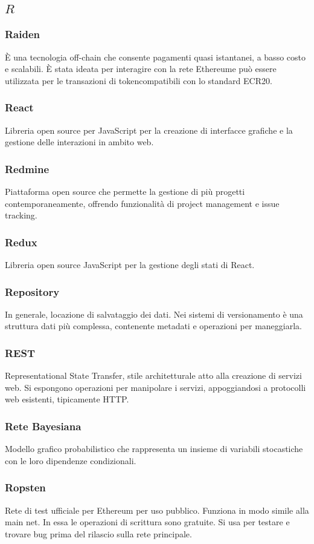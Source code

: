 \subsection*{\quad$R\quad$}
\subsubsection*{Raiden}
È una tecnologia off-chain che consente pagamenti quasi istantanei, a basso costo e scalabili. È stata ideata per interagire con la rete Ethereum\glosp e può essere utilizzata per le transazioni di token\glosp compatibili con lo standard ECR20\glo.

\subsubsection*{React}
Libreria open source per JavaScript per la creazione di interfacce grafiche e la gestione delle interazioni in ambito web.

\subsubsection*{Redmine}
Piattaforma open source che permette la gestione di più progetti contemporaneamente, offrendo funzionalità di project management e issue tracking.

\subsubsection*{Redux}
Libreria open source JavaScript per la gestione degli stati di React\glo.

\subsubsection*{Repository}
In generale, locazione di salvataggio dei dati. Nei sistemi di versionamento è una struttura dati più complessa, contenente metadati e operazioni per maneggiarla.

\subsubsection*{REST}
Representational State Transfer, stile architetturale atto alla creazione di servizi web. Si espongono operazioni per manipolare i servizi, appoggiandosi a protocolli web esistenti, tipicamente HTTP.

\subsubsection*{Rete Bayesiana}
Modello grafico probabilistico che rappresenta un insieme di variabili stocastiche con le loro dipendenze condizionali.

\subsubsection*{Ropsten}
Rete di test ufficiale per Ethereum per uso pubblico. Funziona in modo simile alla main net. In essa le operazioni di scrittura sono gratuite. Si usa per testare e trovare bug prima del rilascio sulla rete principale.


